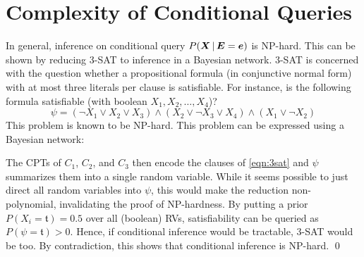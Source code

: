 	\section{Complexity of Conditional Queries}
		In general, inference on conditional query \( P(\bm{X} \,\vert\, \bm{E} = \bm{e}) \) is NP-hard. This can be shown by reducing 3-SAT to inference in a Bayesian network. 3-SAT is concerned with the question whether a propositional formula (in conjunctive normal form) with at most three literals per clause is satisfiable. For instance, is the following formula satisfiable (with boolean \(X_1, X_2, \dots, X_4\))?
		\begin{equation}
			\psi = (\lnot X_1 \lor X_2 \lor X_3) \land (X_2 \lor \lnot X_3 \lor X_4) \land (X_1 \lor \lnot X_2)  \label{eqn:3sat}
		\end{equation}
		This problem is known to be NP-hard. This problem can be expressed using a Bayesian network:
		\begin{center}
		\end{center}
		The CPTs of \(C_1\), \(C_2\), and \(C_3\) then encode the clauses of \eqref{eqn:3sat} and \(\psi\) summarizes them into a single random variable. While it seems possible to just direct all random variables into \(\psi\), this would make the reduction non-polynomial, invalidating the proof of NP-hardness. By putting a prior \( P(X_i = \mathfrak{t}) = 0.5 \) over all (boolean) RVs, satisfiability can be queried as \( P(\psi = \mathfrak{t}) > 0 \). Hence, if conditional inference would be tractable, 3-SAT would be too. By contradiction, this shows that conditional inference is NP-hard.
		\qed

